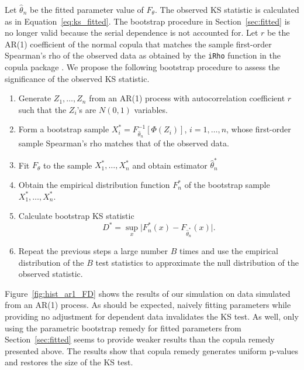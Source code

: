 \documentclass[12pt, letterpaper, titlepage]{article}
\begin{document}
Let $\hat\theta_n$ be the fitted parameter value of $F_{\theta}$. The observed
KS statistic is calculated as in Equation~\eqref{eq:ks_fitted}. The bootstrap
procedure in Section~\ref{sec:fitted} is no longer valid because the serial
dependence is not accounted for. Let $r$ be the AR(1) coefficient of the normal 
copula that matches the sample first-order Spearman's rho of the observed data 
as obtained by the \texttt{iRho} function in the \textsf{copula} package 
\citep{Copula}. We propose the following bootstrap procedure to assess the 
significance of the observed KS statistic.
\begin{enumerate}
\item
  Generate $Z_1, \ldots, Z_n$ from an AR(1) process with autocorrelation
  coefficient $r$ such that the $Z_i$'s are $N(0, 1)$ variables.
\item
  Form a bootstrap sample $X_i^* = F^{-1}_{\hat\theta_n} [\Phi(Z_i)]$,
  $i = 1, \ldots, n$, whose first-order sample Spearman's rho matches that of
  the observed data.
\item
  Fit $F_\theta$ to the sample $X_1^*, \ldots, X_n^*$ and obtain estimator 
  $\hat\theta_n^*$
\item
  Obtain the empirical distribution function $F_n^*$ of the bootstrap sample
  $X_1^*, \ldots, X_n^*$.
\item 
  Calculate bootstrap KS statistic
  \[
    D^* = \sup_x \lvert F_n^* (x)- F_{\hat\theta_n^*}(x) \rvert.
  \]
\item
  Repeat the previous steps a large number $B$ times and use the empirical
    distribution of the $B$ test statistics to approximate
    the null distribution of the observed statistic.      
\end{enumerate}

Figure~\ref{fig:hist_ar1_FD} shows the results of our simulation on data 
simulated from an AR(1) process. As should be expected, naively fitting 
parameters while providing no adjustment for dependent data invalidates the KS 
test. As well, only using the parametric bootstrap remedy for fitted parameters 
from Section~\ref{sec:fitted} seems to provide weaker results than the 
copula remedy presented above. The results show that copula remedy generates 
uniform p-values and restores the size of the KS test.
\end{document}
